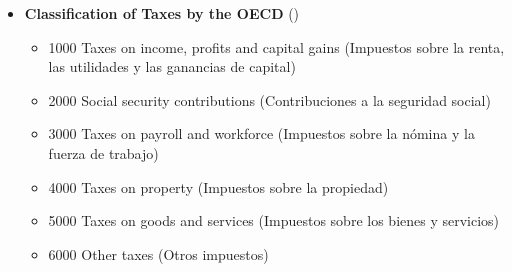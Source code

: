 \documentclass[
  ignorenonframetext,
]{beamer}
\providecommand{\tightlist}{%
  \setlength{\itemsep}{0pt}\setlength{\parskip}{0pt}}\usepackage{longtable,booktabs,array}
\begin{document}
\begin{frame}{}
\label{section-14}
\begin{itemize}
\item
  \textbf{Classification of Taxes by the OECD}
  ()

  \begin{itemize}
  \tightlist
  \item
    1000 Taxes on income, profits and capital gains (Impuestos sobre la
    renta, las utilidades y las ganancias de capital)
  \item
    2000 Social security contributions (Contribuciones a la seguridad
    social)
  \item
    3000 Taxes on payroll and workforce (Impuestos sobre la nómina y la
    fuerza de trabajo)
  \item
    4000 Taxes on property (Impuestos sobre la propiedad)
  \item
    5000 Taxes on goods and services (Impuestos sobre los bienes y
    servicios)
  \item
    6000 Other taxes (Otros impuestos)
  \end{itemize}
\end{itemize}
\end{frame}
\end{document}
